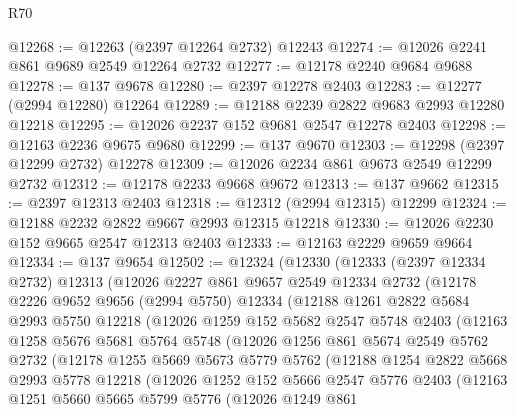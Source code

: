 \begin{lexlean}{R70}
\begin{coremodule}
@12268 := @12263 (@2397 @12264 @2732) @12243
@12274 := @12026 @2241 @861 @9689 @2549 @12264 @2732
@12277 := @12178 @2240 @9684 @9688
@12278 := @137 @9678
@12280 := @2397 @12278 @2403
@12283 := @12277 (@2994 @12280) @12264
@12289 := @12188 @2239 @2822 @9683 @2993 @12280 @12218
@12295 := @12026 @2237 @152 @9681 @2547 @12278 @2403
@12298 := @12163 @2236 @9675 @9680
@12299 := @137 @9670
@12303 := @12298 (@2397 @12299 @2732) @12278
@12309 := @12026 @2234 @861 @9673 @2549 @12299 @2732
@12312 := @12178 @2233 @9668 @9672
@12313 := @137 @9662
@12315 := @2397 @12313 @2403
@12318 := @12312 (@2994 @12315) @12299
@12324 := @12188 @2232 @2822 @9667 @2993 @12315 @12218
@12330 := @12026 @2230 @152 @9665 @2547 @12313 @2403
@12333 := @12163 @2229 @9659 @9664
@12334 := @137 @9654
@12502 := @12324
    (@12330
      (@12333
        (@2397 @12334 @2732)
        @12313
        (@12026
          @2227
          @861
          @9657
          @2549
          @12334
          @2732
          (@12178
            @2226
            @9652
            @9656
            (@2994 @5750)
            @12334
            (@12188
              @1261
              @2822
              @5684
              @2993
              @5750
              @12218
              (@12026
                @1259
                @152
                @5682
                @2547
                @5748
                @2403
                (@12163
                  @1258
                  @5676
                  @5681
                  @5764
                  @5748
                  (@12026
                    @1256
                    @861
                    @5674
                    @2549
                    @5762
                    @2732
                    (@12178
                      @1255
                      @5669
                      @5673
                      @5779
                      @5762
                      (@12188
                        @1254
                        @2822
                        @5668
                        @2993
                        @5778
                        @12218
                        (@12026
                          @1252
                          @152
                          @5666
                          @2547
                          @5776
                          @2403
                          (@12163
                            @1251
                            @5660
                            @5665
                            @5799
                            @5776
                            (@12026
                              @1249
                              @861

\end{coremodule}
\end{lexlean}

